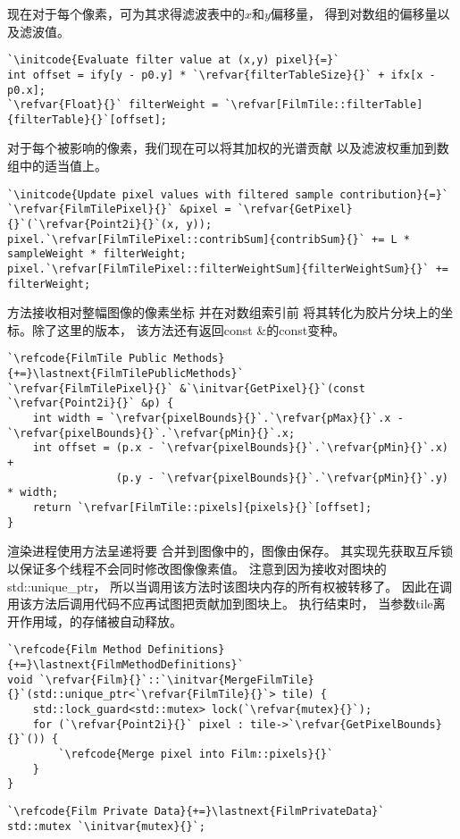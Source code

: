 现在对于每个像素，可为其求得滤波表中的$x$和$y$偏移量，
得到对数组的偏移量以及滤波值。
\begin{lstlisting}
`\initcode{Evaluate filter value at (x,y) pixel}{=}`
int offset = ify[y - p0.y] * `\refvar{filterTableSize}{}` + ifx[x - p0.x];
`\refvar{Float}{}` filterWeight = `\refvar[FilmTile::filterTable]{filterTable}{}`[offset];
\end{lstlisting}

对于每个被影响的像素，我们现在可以将其加权的光谱贡献
以及滤波权重加到数组中的适当值上。
\begin{lstlisting}
`\initcode{Update pixel values with filtered sample contribution}{=}`
`\refvar{FilmTilePixel}{}` &pixel = `\refvar{GetPixel}{}`(`\refvar{Point2i}{}`(x, y));
pixel.`\refvar[FilmTilePixel::contribSum]{contribSum}{}` += L * sampleWeight * filterWeight;
pixel.`\refvar[FilmTilePixel::filterWeightSum]{filterWeightSum}{}` += filterWeight;
\end{lstlisting}

方法接收相对整幅图像的像素坐标
并在对数组索引前
将其转化为胶片分块上的坐标。除了这里的版本，
该方法还有返回{\ttfamily const  \&}的{\ttfamily const}变种。
\begin{lstlisting}
`\refcode{FilmTile Public Methods}{+=}\lastnext{FilmTilePublicMethods}`
`\refvar{FilmTilePixel}{}` &`\initvar{GetPixel}{}`(const `\refvar{Point2i}{}` &p) {
    int width = `\refvar{pixelBounds}{}`.`\refvar{pMax}{}`.x - `\refvar{pixelBounds}{}`.`\refvar{pMin}{}`.x;
    int offset = (p.x - `\refvar{pixelBounds}{}`.`\refvar{pMin}{}`.x) +
                 (p.y - `\refvar{pixelBounds}{}`.`\refvar{pMin}{}`.y) * width;
    return `\refvar[FilmTile::pixels]{pixels}{}`[offset];
}
\end{lstlisting}

渲染进程使用方法呈递将要
合并到图像中的，图像由保存。
其实现先获取互斥锁以保证多个线程不会同时修改图像像素值。
注意到因为接收对图块的{\ttfamily std::unique\_ptr}，
所以当调用该方法时该图块内存的所有权被转移了。
因此在调用该方法后调用代码不应再试图把贡献加到图块上。
执行结束时，
当参数{\ttfamily tile}离开作用域，的存储被自动释放。
\begin{lstlisting}
`\refcode{Film Method Definitions}{+=}\lastnext{FilmMethodDefinitions}`
void `\refvar{Film}{}`::`\initvar{MergeFilmTile}{}`(std::unique_ptr<`\refvar{FilmTile}{}`> tile) {
    std::lock_guard<std::mutex> lock(`\refvar{mutex}{}`);
    for (`\refvar{Point2i}{}` pixel : tile->`\refvar{GetPixelBounds}{}`()) {
        `\refcode{Merge pixel into Film::pixels}{}`
    }
}
\end{lstlisting}
\begin{lstlisting}
`\refcode{Film Private Data}{+=}\lastnext{FilmPrivateData}`
std::mutex `\initvar{mutex}{}`;
\end{lstlisting}

